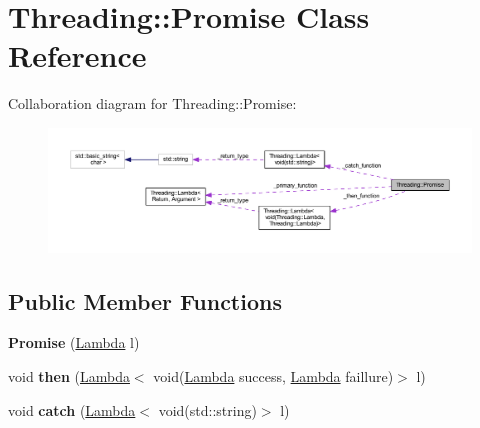 \hypertarget{class_threading_1_1_promise}{}\section{Threading\+:\+:Promise Class Reference}
\label{class_threading_1_1_promise}


Collaboration diagram for Threading\+:\+:Promise\+:
\nopagebreak
\begin{figure}[H]
\begin{center}
\leavevmode
\includegraphics[width=350pt]{class_threading_1_1_promise__coll__graph}
\end{center}
\end{figure}
\subsection*{Public Member Functions}
\begin{DoxyCompactItemize}
\item 
{\bfseries Promise} (\hyperlink{class_threading_1_1_lambda}{Lambda} l)\hypertarget{class_threading_1_1_promise_a2f98b22f7246aff0d7d9f000f7628267}{}\label{class_threading_1_1_promise_a2f98b22f7246aff0d7d9f000f7628267}

\item 
void {\bfseries then} (\hyperlink{class_threading_1_1_lambda}{Lambda}$<$ void(\hyperlink{class_threading_1_1_lambda}{Lambda} success, \hyperlink{class_threading_1_1_lambda}{Lambda} faillure)$>$ l)\hypertarget{class_threading_1_1_promise_a37a2bd76dd97c9fa71e6bd18dc7f69de}{}\label{class_threading_1_1_promise_a37a2bd76dd97c9fa71e6bd18dc7f69de}

\item 
void {\bfseries catch} (\hyperlink{class_threading_1_1_lambda}{Lambda}$<$ void(std\+::string)$>$ l)\hypertarget{class_threading_1_1_promise_ad37ac3724f9d94c63441446adc9fff2e}{}\label{class_threading_1_1_promise_ad37ac3724f9d94c63441446adc9fff2e}

\end{DoxyCompactItemize}
